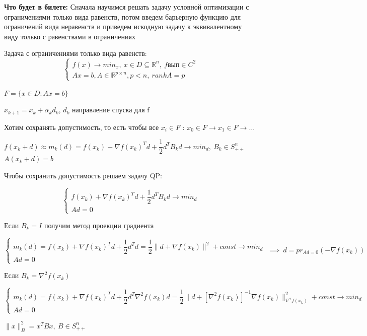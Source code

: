 \textbf{Что будет в билете:} Сначала научимся решать задачу условной оптимизации с ограничениями только вида равенств, потом введем барьерную функцию для ограничений вида неравенств и приведем искодную задачу к эквивалентному виду только с равенствами в ограничениях

\bigskip

Задача с ограничениями только вида равенств:
\[
\begin{cases}
f(x) \to min_x, \ x \in D \subseteq \mathbb{R}^n, \ f \text{вып} \in C^{2} \\
Ax = b, A \in \mathbb{R}^{p \times n}, p < n, \ rank A = p
\end{cases}
\]

$F = \{ x \in D : Ax = b \}$

\bigskip


$x_{k+1} = x_k + \alpha_k d_k$, $d_k$ направление спуска для f

Хотим сохранять допустимость, то есть чтобы все $x_i \in F$ : $x_0 \in F \to x_1 \in F \to \dots $

$f(x_k + d) \approx m_k(d) = f(x_k) + \nabla f(x_k)^Td + \dfrac{1}{2} d^TB_k d \to min_d, \ B_k \in S_{++}^n $
$A(x_k + d) = b$

Чтобы сохранить допустимость решаем задачу QP:

\[
\begin{cases}
 f(x_k) + \nabla f(x_k)^Td + \dfrac{1}{2} d^TB_k d \to min_d \\
 Ad = 0
\end{cases}
\]

Если $B_k = I$ получим метод проекции градиента

\[\begin{cases}
m_k(d) = f(x_k) + \nabla f(x_k)^Td + \dfrac{1}{2} d^T d  = \dfrac{1}{2} \| d + \nabla f(x_k) \|^2  + const \to min_d\\
Ad = 0
\end{cases}
\ \implies \ d = pr_{Ad = 0}(- \nabla f(x_k))
\]


Если $B_k = \nabla^2 f(x_k)$

\[\begin{cases}
m_k(d) = f(x_k) + \nabla f(x_k)^Td + \dfrac{1}{2} d^T \nabla^2 f(x_k)d  = \dfrac{1}{2} \| d +[ \nabla^2 f(x_k)]^{-1} \nabla f(x_k) \|^2_{\nabla^2 f(x_k)}  + const \to min_d\\
Ad = 0
\end{cases}
\]

$\| x \|^2_{B} = x^TBx, \ B \in S_{++}^n$

